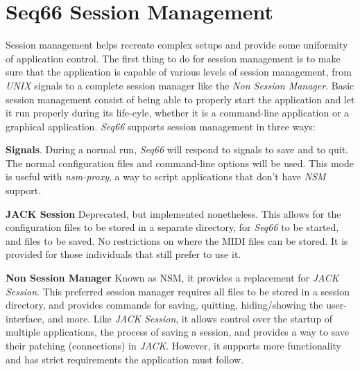 %
%
%

\section{Seq66 Session Management}
\label{sec:sessions}

   Session management helps recreate complex setups and provide some uniformity
   of application control.
   The first thing to do for session management is to make sure that the
   application is capable of various levels of session management, from
   \textsl{UNIX} signals to
   a complete session manager like the \textsl{Non Session Manager}.
   Basic session management consist of being able to properly start the
   application and let it run properly during its life-cyle, whether it is a
   command-line application or a graphical application.
   \textsl{Seq66} supports session management in three ways:

   \begin{enumber}
      \item \textbf{Signals}.
         During a normal run, \textsl{Seq66} will respond
         to signals to save and to quit.
         The normal configuration files and command-line options will be used.
         This mode is useful with \textsl{nsm-proxy}, a way to script
         applications that don't have \textsl{NSM} support.
      \item \textbf{JACK Session}
         Deprecated, but implemented nonetheless.
         This allows for the configuration files to be stored in
         a separate directory, for \textsl{Seq66} to be started, and files to be
         saved.  No restrictions on where the MIDI files can be stored.
         It is provided for those individuals that still prefer to use it.
      \item \textbf{Non Session Manager}
         Known as NSM, it provides a replacement for \textsl{JACK Session}.
         This preferred session manager requires all files to be
         stored in a session directory, and provides commands for saving,
         quitting, hiding/showing the user-interface, and more.
         Like \textsl{JACK Session}, it allows control over the startup of
         multiple applications, the process of saving a session, and provides a
         way to save their patching (connections) in \textsl{JACK}.
         However, it supports more functionality and has
         strict requirements the application must follow.
   \end{enumber}

